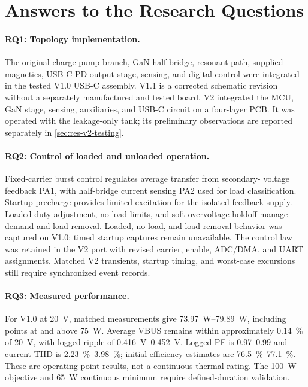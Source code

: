 \section{Answers to the Research Questions}
\label{sec:concl-rq}

\paragraph{RQ1: Topology implementation.}
The original charge-pump branch, GaN half bridge, resonant path, supplied
magnetics, USB-C PD output stage, sensing, and digital control were integrated
in the tested V1.0 USB-C assembly. V1.1 is a corrected schematic revision
without a separately manufactured and tested board. V2 integrated the
MCU, GaN stage, sensing, auxiliaries, and USB-C circuit on a four-layer PCB.
It was operated with the leakage-only tank; its preliminary observations
are reported separately in \cref{sec:res-v2-testing}.

\paragraph{RQ2: Control of loaded and unloaded operation.}
Fixed-carrier burst control regulates average transfer from secondary-
voltage feedback PA1, with half-bridge current sensing PA2 used for load
classification. Startup precharge provides limited excitation for the isolated feedback supply. Loaded
duty adjustment, no-load limits, and soft overvoltage holdoff manage demand
and load removal. Loaded, no-load, and load-removal behavior was captured on V1.0; timed startup captures remain unavailable. The control
law was retained in the V2 port with revised carrier, enable, ADC/DMA, and
UART assignments. Matched V2 transients, startup timing, and worst-case
excursions still require synchronized event records.

\paragraph{RQ3: Measured performance.}
For V1.0 at \SI{20}{\volt}, matched measurements give
\SIrange{73.97}{79.89}{\watt}, including points at and above
\SI{75}{\watt}. Average VBUS remains within approximately
\SI{0.14}{\percent} of \SI{20}{\volt}, with logged ripple of
\SIrange{0.416}{0.452}{\volt}. Logged PF is 0.97--0.99 and current THD
is \SIrange{2.23}{3.98}{\percent}; initial efficiency estimates are
\SIrange{76.5}{77.1}{\percent}. These are operating-point results,
not a continuous thermal rating. The \SI{100}{\watt} objective and
\SI{65}{\watt} continuous minimum require defined-duration validation.

